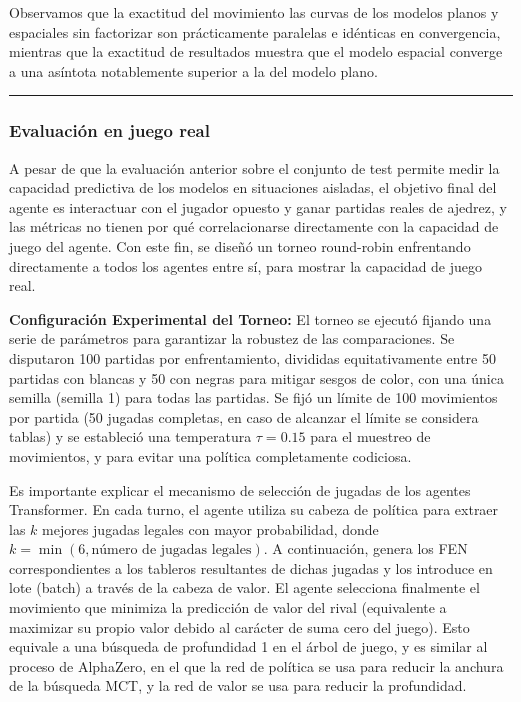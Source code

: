 \documentclass[12pt, a4paper]{article}
\begin{document}
Observamos que la exactitud del movimiento las curvas de los modelos planos y espaciales sin factorizar son prácticamente paralelas e idénticas en convergencia, mientras que la exactitud de resultados muestra que el modelo espacial converge a una asíntota notablemente superior a la del modelo plano.

\rule{\textwidth}{0.2pt}
\subsubsection{Evaluación en juego real} \label{sec:eval_juego_h2}

A pesar de que la evaluación anterior sobre el conjunto de test permite medir la capacidad predictiva de los modelos en situaciones aisladas, el objetivo final del agente es interactuar con el jugador opuesto y ganar partidas reales de ajedrez, y las métricas no tienen por qué correlacionarse directamente con la capacidad de juego del agente. Con este fin, se diseñó un torneo round-robin enfrentando directamente a todos los agentes entre sí, para mostrar la capacidad de juego real. 

\textbf{Configuración Experimental del Torneo:}
El torneo se ejecutó fijando una serie de parámetros para garantizar la robustez de las comparaciones. Se disputaron 100 partidas por enfrentamiento, divididas equitativamente entre 50 partidas con blancas y 50 con negras para mitigar sesgos de color, con una única semilla (semilla 1) para todas las partidas. Se fijó un límite de 100 movimientos por partida (50 jugadas completas, en caso de alcanzar el límite se considera tablas) y se estableció una temperatura $\tau = 0.15$ para el muestreo de movimientos, y para evitar una política completamente codiciosa.

Es importante explicar el mecanismo de selección de jugadas de los agentes Transformer. En cada turno, el agente utiliza su cabeza de política para extraer las $k$ mejores jugadas legales con mayor probabilidad, donde $k = \min(6, \text{número de jugadas legales})$. A continuación, genera los FEN correspondientes a los tableros resultantes de dichas jugadas y los introduce en lote (batch) a través de la cabeza de valor. El agente selecciona finalmente el movimiento que minimiza la predicción de valor del rival (equivalente a maximizar su propio valor debido al carácter de suma cero del juego). Esto equivale a una búsqueda de profundidad 1 en el árbol de juego, y es similar al proceso de AlphaZero, en el que la red de política se usa para reducir la anchura de la búsqueda MCT, y la red de valor se usa para reducir la profundidad.
\end{document}
